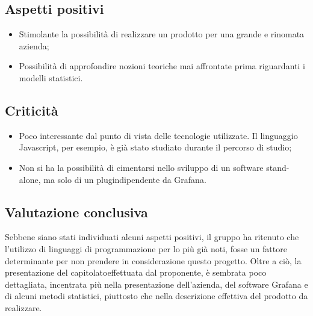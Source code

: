 \subsection{Aspetti positivi}
\begin{itemize}
	\item Stimolante la possibilità di realizzare un prodotto per una grande e rinomata azienda;
	\item Possibilità di approfondire nozioni teoriche mai affrontate prima riguardanti i modelli statistici.
\end{itemize}

\subsection{Criticità}
\begin{itemize}
	\item Poco interessante dal punto di vista delle tecnologie utilizzate. Il linguaggio Javascript, per esempio, è già stato studiato durante il percorso di studio;
	\item Non si ha la possibilità di cimentarsi nello sviluppo di un software stand-alone\glos, ma solo di un plugin\glo dipendente da Grafana. 
\end{itemize}

\subsection{Valutazione conclusiva}
Sebbene siano stati individuati alcuni aspetti positivi, il gruppo ha ritenuto che l'utilizzo di linguaggi di programmazione per lo più già noti, fosse un fattore determinante per non prendere in considerazione questo progetto. Oltre a ciò, la presentazione del capitolato\glo effettuata dal proponente, è sembrata poco dettagliata, incentrata più nella presentazione dell'azienda, del software Grafana e di alcuni metodi statistici, piuttosto che nella descrizione effettiva del prodotto da realizzare.